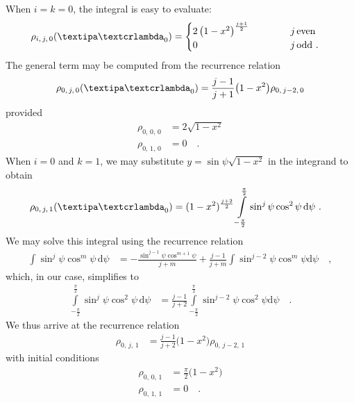 \documentclass[modern]{aastex631}
\begin{document}
%
When $i = k = 0$, the integral is easy to evaluate:
%
\begin{align}
    \rho_{i,\,j,\,0}(\lnlam_0)
     & =
    \begin{cases}
        2 \left( 1 - x^2 \right)^\frac{j + 1}{2}
        \quad\quad\quad\quad\quad\quad\quad\quad\quad\quad\quad\quad
          & j \, \mathrm{even}        \\
        0 & j \, \mathrm{odd} \quad .
    \end{cases}
\end{align}
%
The general term may be computed from the recurrence relation
%
\begin{align}
    \rho_{0,\,j,\,0}(\lnlam_0) = \frac{j - 1}{j + 1} \big(1 - x^2\big) \rho_{0,\,j-2,\,0}
\end{align}
%
provided
%
\begin{align}
    \rho_{0,\,0,\,0} & = 2 \sqrt{1-x^2} \nonumber \\
    \rho_{0,\,1,\,0} & = 0 \quad.
\end{align}
%
When $i = 0$ and $k = 1$, we may substitute $y = \sin\psi\sqrt{1 - x^2}$ in the integrand to obtain
%
\begin{align}
    \rho_{0,\,j,\,1}(\lnlam_0)
     & =
    (1 - x^2)^{\frac{j + 2}{2}}
    \int\limits_{-\frac{\pi}{2}}^{\frac{\pi}{2}}
    \sin^j\psi
    \cos^2\psi \,
    \mathrm{d}\psi
    \quad.
\end{align}
%
We may solve this integral using the recurrence relation
%
\begin{align}
    \int
    \sin^j\psi
    \cos^m\psi \,
    \mathrm{d}\psi
     & =
    -\frac{\sin^{j-1}\psi \cos^{m+1}\psi}{j + m}
    +
    \frac{j - 1}{j + m}\int\sin^{j-2}\psi \cos^m\psi \mathrm{d}\psi
    \quad ,
\end{align}
%
which, in our case, simplifies to
%
\begin{align}
    \int\limits_{-\frac{\pi}{2}}^{\frac{\pi}{2}}
    \sin^j\psi
    \cos^2\psi \,
    \mathrm{d}\psi
     & =
    \frac{j - 1}{j + 2}\int\limits_{-\frac{\pi}{2}}^
    {\frac{\pi}{2}}\sin^{j-2}\psi \cos^2\psi \mathrm{d}\psi
    \quad.
\end{align}
%
We thus arrive at the recurrence relation
%
\begin{align}
    \rho_{0,\,j,\,1} & = \frac{j - 1}{j + 2} \big(1 - x^2\big) \rho_{0,\,j-2,\,1}
\end{align}
%
with initial conditions
%
\begin{align}
    \rho_{0,\,0,\,1} & = \frac{\pi}{2} \big(1-x^2\big) \nonumber \\
    \rho_{0,\,1,\,1} & = 0 \quad.
\end{align}
\end{document}
